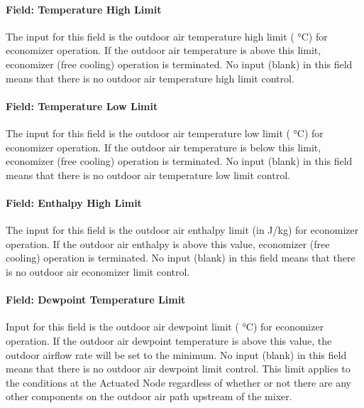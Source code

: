 \paragraph{Field: Temperature High Limit}\label{field-temperature-high-limit}

The input for this field is the outdoor air temperature high limit ( °C) for economizer operation. If the outdoor air temperature is above this limit, economizer (free cooling) operation is terminated. No input (blank) in this field means that there is no outdoor air temperature high limit control.

\paragraph{Field: Temperature Low Limit}\label{field-temperature-low-limit}

The input for this field is the outdoor air temperature low limit ( °C) for economizer operation. If the outdoor air temperature is below this limit, economizer (free cooling) operation is terminated. No input (blank) in this field means that there is no outdoor air temperature low limit control.

\paragraph{Field: Enthalpy High Limit}\label{field-enthalpy-high-limit}

The input for this field is the outdoor air enthalpy limit (in J/kg) for economizer operation. If the outdoor air enthalpy is above this value, economizer (free cooling) operation is terminated. No input (blank) in this field means that there is no outdoor air economizer limit control.

\paragraph{Field: Dewpoint Temperature Limit}\label{field-dewpoint-temperature-limit}

Input for this field is the outdoor air dewpoint limit ( °C) for economizer operation. If the outdoor air dewpoint temperature is above this value, the outdoor airflow rate will be set to the minimum. No input (blank) in this field means that there is no outdoor air dewpoint limit control. This limit applies to the conditions at the Actuated Node regardless of whether or not there are any other components on the outdoor air path upstream of the mixer.

